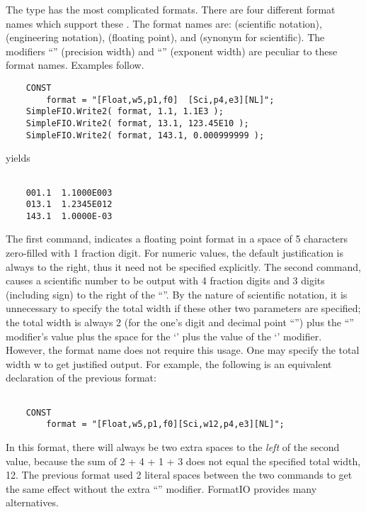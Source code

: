 The type  has the most complicated formats.  There are
four different format names which support these .  The
format names are:  (scientific notation),  (engineering
notation),  (floating point), and  (synonym for
scientific).  The modifiers ``'' (precision width) and ``'' 
(exponent width)
are peculiar to these format names.  Examples follow.
\begin{verbatim}
    CONST
        format = "[Float,w5,p1,f0]  [Sci,p4,e3][NL]";
    SimpleFIO.Write2( format, 1.1, 1.1E3 );
    SimpleFIO.Write2( format, 13.1, 123.45E10 ); 
    SimpleFIO.Write2( format, 143.1, 0.000999999 );
\end{verbatim}
yields
\begin{verbatim}

    001.1  1.1000E003
    013.1  1.2345E012
    143.1  1.0000E-03

\end{verbatim}
The first command, \code{[Float,w5,p1,f0]} indicates a floating 
point format in a space
of 5 characters zero-filled with 1 fraction digit.  For numeric
values, the default justification is always to the right, thus it need not
be specified explicitly.  The second command, \code{Sci,p4,e3]} causes a 
scientific
number to be output with 4 fraction digits and 3 digits (including sign)
to the right of the ``''.  By the nature of scientific notation,
it is unnecessary to specify the total width if these other
two parameters are specified; the total width is always 2 (for the one's
digit and decimal point ``'') plus the ``'' modifier's 
value plus
the space for the `' plus the value of the `' modifier.
However, the format name does not require this usage.  One may specify
the total width w to get justified output.  For example,
the following is an equivalent declaration of the previous format:
\begin{verbatim}

    CONST
        format = "[Float,w5,p1,f0][Sci,w12,p4,e3][NL]";

\end{verbatim}
In this format, there will always be two extra
spaces to the {\em left} of the second value, because the sum
of 2 + 4 + 1 + 3 does not equal the specified total width, 12.
The previous format used 2 literal spaces between the two commands
to get the same effect without the extra ``'' modifier.
FormatIO provides many alternatives.


